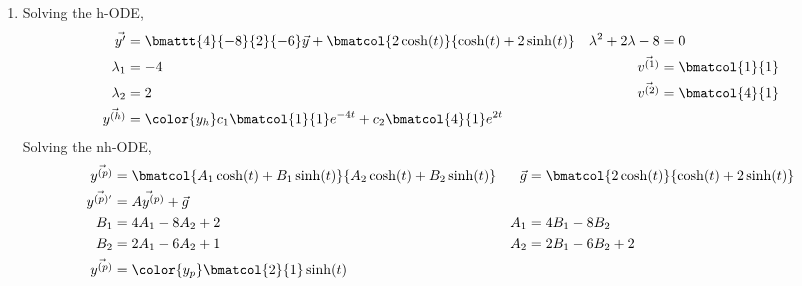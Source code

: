 \begin{enumerate}
    \item Solving the h-ODE,
          \begin{align}
              \vec{y'}                   & = \bmattt{4}{-8}{2}{-6} \vec{y}
              + \bmatcol{2\cosh(t)}
              {\cosh(t) + 2\sinh(t)}     &
              \lambda^{2} + 2\lambda - 8 & = 0                               \\
              \lambda_1                  & = -4                            &
              \vec{v^{(1)}}              & = \bmatcol{1}{1}                  \\
              \lambda_2                  & = 2                             &
              \vec{v^{(2)}}              & = \bmatcol{4}{1}                  \\
              \vec{y^{(h)}}              & = \color{y_h}
              c_1 \bmatcol{1}{1}e^{-4t} + c_2 \bmatcol{4}{1} e^{2t}
          \end{align}
          Solving the nh-ODE,
          \begin{align}
              \vec{y^{(p)}}               & = \bmatcol{A_1\cosh(t) + B_1\sinh(t)}
              {A_2\cosh(t) + B_2\sinh(t)} &
              \vec{g}                     & = \bmatcol{2 \cosh(t)}
              {\cosh(t) + 2\sinh(t)}                                                \\
              \vec{y^{(p)'}}              & = \vec{Ay^{(p)}} + \vec{g}              \\
              B_1                         & = 4A_1 - 8A_2 + 2                     &
              A_1                         & = 4B_1 - 8B_2                           \\
              B_2                         & = 2A_1 - 6A_2 + 1                     &
              A_2                         & = 2B_1 - 6B_2 + 2                       \\
              \vec{y^{(p)}}               & = \color{y_p}
              \bmatcol{2}{1} \sinh(t)
          \end{align}


\end{enumerate}
